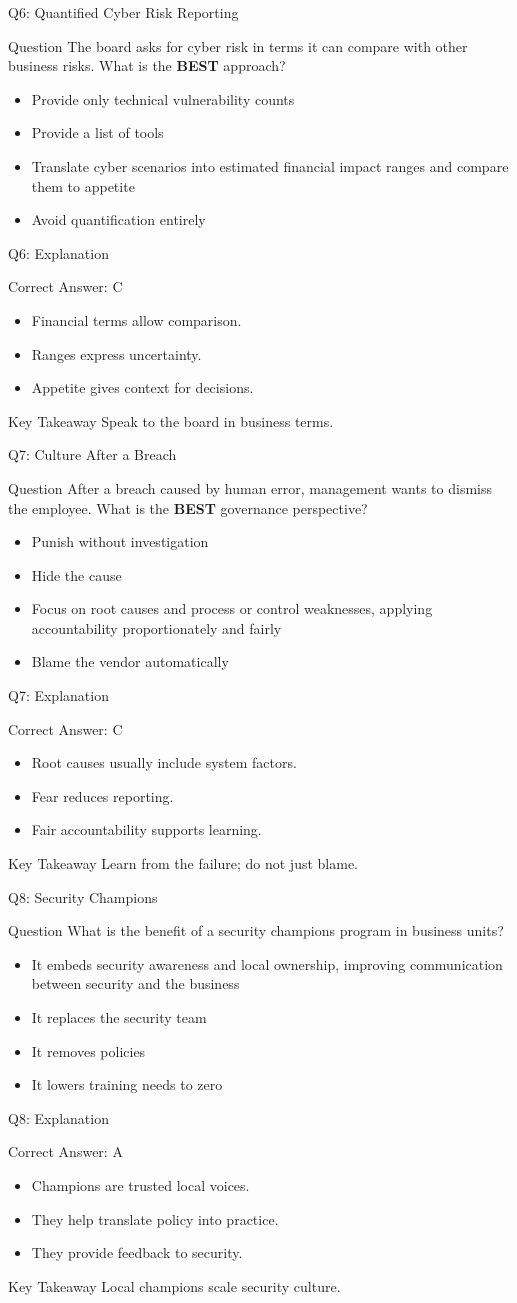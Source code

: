 \documentclass[aspectratio=169]{beamer}
\newcommand{\hq}[7]{%
	\begin{frame}{Q#1: #2}
		\begin{block}{Question}
			#3
		\end{block}
		\begin{itemize}
			#4
		\end{itemize}
	\end{frame}
	\begin{frame}{Q#1: Explanation}
		\begin{block}{Correct Answer: #5}
			\begin{itemize}
				#6
			\end{itemize}
		\end{block}
		\begin{alertblock}{Key Takeaway}
			#7
		\end{alertblock}
	\end{frame}
}
\begin{document}
	\hq{6}{Quantified Cyber Risk Reporting}
	{The board asks for cyber risk in terms it can compare with other business risks. What is the \textbf{BEST} approach?}
	{\item[\textbf{(A)}] Provide only technical vulnerability counts
		\item[\textbf{(B)}] Provide a list of tools
		\item[\textbf{(C)}] Translate cyber scenarios into estimated financial impact ranges and compare them to appetite
		\item[\textbf{(D)}] Avoid quantification entirely}
	{C}
	{\item Financial terms allow comparison.
		\item Ranges express uncertainty.
		\item Appetite gives context for decisions.}
	{Speak to the board in business terms.}

	\hq{7}{Culture After a Breach}
	{After a breach caused by human error, management wants to dismiss the employee. What is the \textbf{BEST} governance perspective?}
	{\item[\textbf{(A)}] Punish without investigation
		\item[\textbf{(B)}] Hide the cause
		\item[\textbf{(C)}] Focus on root causes and process or control weaknesses, applying accountability proportionately and fairly
		\item[\textbf{(D)}] Blame the vendor automatically}
	{C}
	{\item Root causes usually include system factors.
		\item Fear reduces reporting.
		\item Fair accountability supports learning.}
	{Learn from the failure; do not just blame.}

	\hq{8}{Security Champions}
	{What is the benefit of a security champions program in business units?}
	{\item[\textbf{(A)}] It embeds security awareness and local ownership, improving communication between security and the business
		\item[\textbf{(B)}] It replaces the security team
		\item[\textbf{(C)}] It removes policies
		\item[\textbf{(D)}] It lowers training needs to zero}
	{A}
	{\item Champions are trusted local voices.
		\item They help translate policy into practice.
		\item They provide feedback to security.}
	{Local champions scale security culture.}
\end{document}

